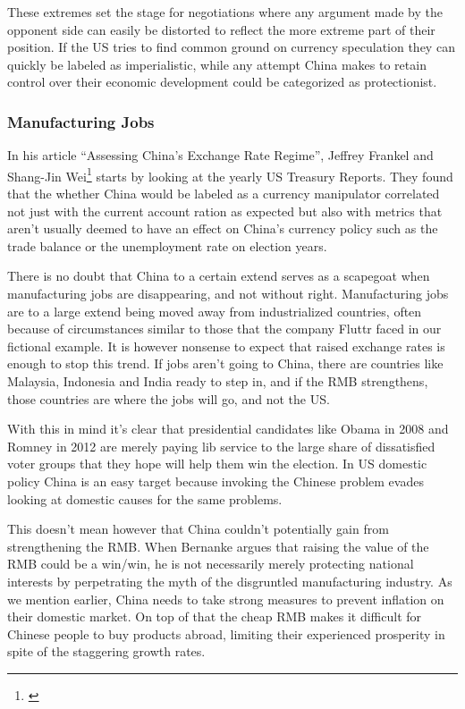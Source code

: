 These extremes set the stage for negotiations where any argument made by 
the opponent side can easily be distorted to reflect the more extreme 
part of their position. If the US tries to find common ground on 
currency speculation they can quickly be labeled as imperialistic, while 
any attempt China makes to retain control over their economic 
development could be categorized as protectionist.

\subsubsection{Manufacturing Jobs}

In his article ``Assessing China's Exchange Rate Regime'', Jeffrey 
Frankel and Shang-Jin Wei\footnote{\cite{Frankel07}} starts by looking 
at the yearly US Treasury Reports. They found that the whether China 
would be labeled as a currency manipulator correlated not just with the 
current account ration as expected but also with metrics that aren't 
usually deemed to have an effect on China's currency policy such as the 
trade balance or the unemployment rate on election years. 

There is no doubt that China to a certain extend serves as a scapegoat 
when manufacturing jobs are disappearing, and not without right.  
Manufacturing jobs are to a large extend being moved away from 
industrialized countries, often because of circumstances similar to 
those that the company Fluttr faced in our fictional example. It is 
however nonsense to expect that raised exchange rates is enough to stop 
this trend. If jobs aren't going to China, there are countries like 
Malaysia, Indonesia and India ready to step in, and if the RMB 
strengthens, those countries are where the jobs will go, and not the US.

With this in mind it's clear that presidential candidates like Obama in 
2008 and Romney in 2012 are merely paying lib service to the large share 
of dissatisfied voter groups that they hope will help them win the 
election. In US domestic policy China is an easy target because invoking 
the Chinese problem evades looking at domestic causes for the same 
problems.

This doesn't mean however that China couldn't potentially gain from 
strengthening the RMB. When Bernanke argues that raising the value of 
the RMB could be a win/win, he is not necessarily merely protecting 
national interests by perpetrating the myth of the disgruntled 
manufacturing industry. As we mention earlier, China needs to take 
strong measures to prevent inflation on their domestic market. On top of 
that the cheap RMB makes it difficult for Chinese people to buy products 
abroad, limiting their experienced prosperity in spite of the staggering 
growth rates.

